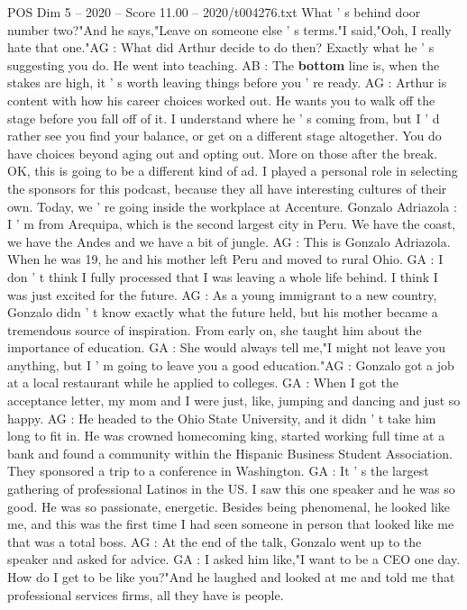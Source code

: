 \begin{textsample}{POS Dim 5 – 2020 – Score 11.00 – 2020/t004276.txt}
What ' s behind door number two?"And he says,"Leave on someone else ' s terms."I said,"Ooh, I really hate that one."AG : What did Arthur decide to do then?
Exactly what he ' s suggesting you do.
He went into teaching.
AB : The \textbf{bottom} line is, when the stakes are high, it ' s worth leaving things before you ' re ready.
AG : Arthur is content with how his career choices worked out.
He wants you to walk off the stage before you fall off of it.
I understand where he ' s coming from, but I ' d rather see you find your balance, or get on a different stage altogether.
You do have choices beyond aging out and opting out.
More on those after the break.
OK, this is going to be a different kind of ad.
I played a personal role in selecting the sponsors for this podcast, because they all have interesting cultures of their own.
Today, we ' re going inside the workplace at Accenture.
Gonzalo Adriazola : I ' m from Arequipa, which is the second largest city in Peru.
We have the coast, we have the Andes and we have a bit of jungle.
AG : This is Gonzalo Adriazola.
When he was 19, he and his mother left Peru and moved to rural Ohio.
GA : I don ' t think I fully processed that I was leaving a whole life behind.
I think I was just excited for the future.
AG : As a young immigrant to a new country, Gonzalo didn ' t know exactly what the future held, but his mother became a tremendous source of inspiration.
From early on, she taught him about the importance of education.
GA : She would always tell me,"I might not leave you anything, but I ' m going to leave you a good education."AG : Gonzalo got a job at a local restaurant while he applied to colleges.
GA : When I got the acceptance letter, my mom and I were just, like, jumping and dancing and just so happy.
AG : He headed to the Ohio State University, and it didn ' t take him long to fit in.
He was crowned homecoming king, started working full time at a bank and found a community within the Hispanic Business Student Association.
They sponsored a trip to a conference in Washington.
GA : It ' s the largest gathering of professional Latinos in the US.
I saw this one speaker and he was so good.
He was so passionate, energetic.
Besides being phenomenal, he looked like me, and this was the first time I had seen someone in person that looked like me that was a total boss.
AG : At the end of the talk, Gonzalo went up to the speaker and asked for advice.
GA : I asked him like,"I want to be a CEO one day.
How do I get to be like you?"And he laughed and looked at me and told me that professional services firms, all they have is people.

\end{textsample}
